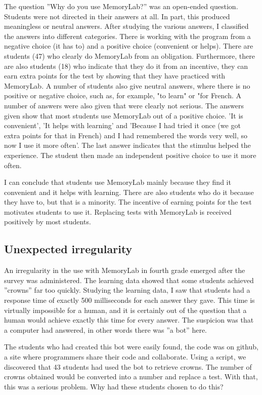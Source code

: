 \documentclass[12pt, a4paper]{article}
\begin{document}
{{The question ''Why do you use MemoryLab?'' was an open-ended question. Students were not directed in their answers at all. In part, this produced meaningless or neutral answers. After studying the various answers, I classified the answers into different categories. There is working with the program from a negative choice (it has to) and a positive choice (convenient or helps). There are students (47) who clearly do MemoryLab from an obligation. Furthermore, there are also students (18) who indicate that they do it from an incentive, they can earn extra points for the test by showing that they have practiced with MemoryLab. A number of students also give neutral answers, where there is no positive or negative choice, such as, for example, "to learn" or "for French. A number of answers were also given that were clearly not serious. The answers given show that most students use MemoryLab out of a positive choice. 'It is convenient', 'It helps with learning' and 'Because I had tried it once (we got extra points for that in French) and I had remembered the words very well, so now I use it more often'. The last answer indicates that the stimulus helped the experience. The student then made an independent positive choice to use it more often.

I can conclude that students use MemoryLab mainly because they find it convenient and it helps with learning. There are also students who do it because they have to, but that is a minority. The incentive of earning points for the test motivates students to use it. Replacing tests with MemoryLab is received positively by most students.

\subsection{Unexpected irregularity}
An irregularity in the use with MemoryLab in fourth grade emerged after the survey was administered. The learning data showed that some students achieved ''crowns'' far too quickly. Studying the learning data, I saw that students had a response time of exactly 500 milliseconds for each answer they gave. This time is virtually impossible for a human, and it is certainly out of the question that a human would achieve exactly this time for every answer. The suspicion was that a computer had answered, in other words there was ''a bot'' here.

The students who had created this bot were easily found, the code was on github, a site where programmers share their code and collaborate. Using a script, we discovered that 43 students had used the bot to retrieve crowns. The number of crowns obtained would be converted into a number and replace a test. With that, this was a serious problem. Why had these students chosen to do this?

}}
\end{document}
